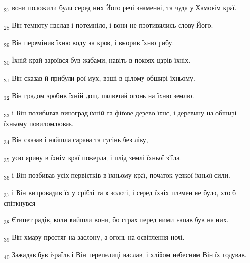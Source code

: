 \begin{tcolorbox}
\textsubscript{27} вони положили були серед них Його речі знаменні, та чуда у Хамовім краї.
\end{tcolorbox}
\begin{tcolorbox}
\textsubscript{28} Він темноту наслав і потемніло, і вони не противились слову Його.
\end{tcolorbox}
\begin{tcolorbox}
\textsubscript{29} Він перемінив їхню воду на кров, і вморив їхню рибу.
\end{tcolorbox}
\begin{tcolorbox}
\textsubscript{30} Їхній край зароївся був жабами, навіть в покоях царів їхніх.
\end{tcolorbox}
\begin{tcolorbox}
\textsubscript{31} Він сказав й прибули рої мух, воші в цілому обширі їхньому.
\end{tcolorbox}
\begin{tcolorbox}
\textsubscript{32} Він градом зробив їхній дощ, палючий огонь на їхню землю.
\end{tcolorbox}
\begin{tcolorbox}
\textsubscript{33} і Він повибивав виноград їхній та фіґове дерево їхнє, і деревину на обширі їхньому повиломлював.
\end{tcolorbox}
\begin{tcolorbox}
\textsubscript{34} Він сказав і найшла сарана та гусінь без ліку,
\end{tcolorbox}
\begin{tcolorbox}
\textsubscript{35} усю ярину в їхнім краї пожерла, і плід землі їхньої з'їла.
\end{tcolorbox}
\begin{tcolorbox}
\textsubscript{36} і Він повбивав усіх первістків в їхньому краї, початок усякої їхньої сили.
\end{tcolorbox}
\begin{tcolorbox}
\textsubscript{37} і Він випровадив їх у сріблі та в золоті, і серед їхніх племен не було, хто б спіткнувся.
\end{tcolorbox}
\begin{tcolorbox}
\textsubscript{38} Єгипет радів, коли вийшли вони, бо страх перед ними напав був на них.
\end{tcolorbox}
\begin{tcolorbox}
\textsubscript{39} Він хмару простяг на заслону, а огонь на освітлення ночі.
\end{tcolorbox}
\begin{tcolorbox}
\textsubscript{40} Зажадав був ізраїль і Він перепелиці наслав, і хлібом небесним Він їх годував.
\end{tcolorbox}
